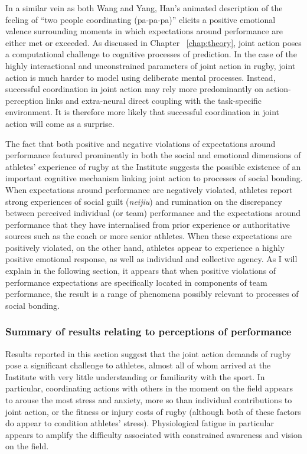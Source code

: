 \begin{CJK}{UTF8}{gbsn}
In a similar vein as both Wang and Yang, Han's animated description of the feeling of ``two people coordinating (pa-pa-pa)'' elicits a positive emotional valence surrounding moments in which expectations around performance are either met or exceeded.  As discussed in Chapter ~\ref{chap:theory}, joint action poses a computational challenge to cognitive processes of prediction.   In the case of the highly interactional and unconstrained parameters of joint action in rugby, joint action is much harder to model using deliberate mental processes.  Instead, successful coordination in joint action may rely more predominantly on action-perception links and extra-neural direct coupling with the task-specific environment. It is therefore more likely that successful coordination in joint action will come as a surprise.

The fact that both positive and negative violations of expectations around performance featured prominently in both the social and emotional dimensions of athletes' experience of rugby at the Institute suggests the possible existence of an important cognitive mechanism linking joint action to processes of social bonding.  When expectations around performance are negatively violated, athletes report strong experiences of social guilt (\textit{neijiu}) and rumination on the discrepancy between perceived individual (or team) performance and the expectations around performance that they have internalised from prior experience or authoritative sources such as the coach or more senior athletes.  When these expectations are positively violated, on the other hand, athletes appear to experience a highly positive emotional response, as well as individual and collective agency.  As I will explain in the following section, it appears that when positive violations of performance expectations are specifically located in components of team performance, the result is a range of phenomena possibly relevant to processes of social bonding.

\subsubsection{Summary of results relating to perceptions of performance}
Results reported in this section suggest that the joint action demands of rugby pose a significant challenge to athletes, almost all of whom arrived at the Institute with very little understanding or familiarity with the sport.  In particular, coordinating actions with others in the moment on the field appears to arouse the most stress and anxiety, more so than individual contributions to joint action, or the fitness or injury costs of rugby (although both of these factors do appear to condition athletes' stress).  Physiological fatigue in particular appears to amplify the difficulty associated with constrained awareness and vision on the field.


\end{CJK}
